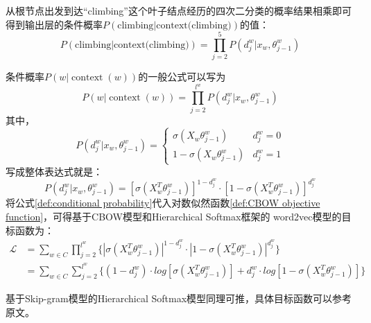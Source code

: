从根节点出发到达“climbing”这个叶子结点经历的四次二分类的概率结果相乘即可得到输出层的条件概率$P(\text{climbing}|\text{context(climbing)})$的值：
\begin{equation}
P(\text{climbing}|\text{context(climbing)}) = \prod_{j=2}^{5}P(d_{j}^{w}|x_w,\theta_{j-1}^{w})
\end{equation}


条件概率$P(w|\operatorname{context}(w))$的一般公式可以写为
\begin{equation}
P(w|\operatorname{context}(w)) = \prod_{j=2}^{l^w}P(d_{j}^{w}|x_w,\theta_{j-1}^{w})
\label{def:conditional probability}
\end{equation}
其中，
\begin{equation}
P(d_{j}^{w}|x_w,\theta_{j-1}^{w}) =\left\{\begin{matrix}

\sigma(X_w\theta_{j-1}^{w}) & d_{j}^{w} = 0

\\
1-\sigma(X_w\theta_{j-1}^{w}) & d_{j}^{w} = 1
\end{matrix}\right.
\end{equation}
写成整体表达式就是：
\begin{equation}
P(d_{j}^{w}|x_w,\theta_{j-1}^{w}) = [\sigma(X_{w}^{T}\theta_{j-1}^{w})]^{1-d_{j}^{w}}\cdot [1-\sigma(X_{w}^{T}\theta_{j-1}^{w})]^{d_{j}^{w}}
\end{equation}
将公式\ref{def:conditional probability}代入对数似然函数\ref{def:CBOW objective function}，可得基于CBOW模型和Hierarchical Softmax框架的
word2vec模型的目标函数为：
\begin{equation}
\begin{aligned}
 \mathcal{L} &= \sum_{w\in C}\prod_{j=2}^{l^{w}} \{|\sigma(X_{w}^{T}\theta_{j-1}^{w})|^{1-d_{j}^{w}} \cdot |1-\sigma(X_{w}^{T}\theta_{j-1}^{w})|^{d_{j}^{w}}\}  \\
&=\sum_{w \in C}\sum_{j=2}^{l^{w}}\{(1-d_{j}^{w})\cdot log[\sigma(X_{w}^{T}\theta_{j-1}^{w})]  +  d_{j}^{w}\cdot log[1-\sigma(X_{w}^{T}\theta_{j-1}^{w})]\} 
\end{aligned}
\end{equation}

基于Skip-gram模型的Hierarchical Softmax模型同理可推，具体目标函数可以参考原文。

